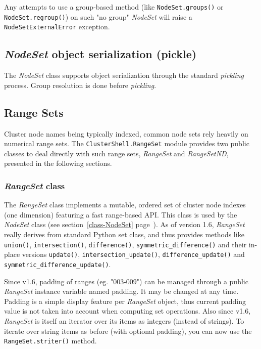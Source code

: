 \documentclass[english,a4paper]{csuserguide}
\newcommand{\NodeSet}{\textit{NodeSet}\xspace}
\newcommand{\RangeSet}{\textit{RangeSet}\xspace}
\newcommand{\RangeSetND}{\textit{RangeSetND}\xspace}
\begin{document}
Any attempts to use a group-based method (like \lstinline+NodeSet.groups()+ or \lstinline+NodeSet.regroup()+) on such "no group" \NodeSet will raise a \texttt{NodeSetExternalError} exception.


\subsection{\NodeSet object serialization (pickle)}

The \NodeSet class supports object serialization through the standard \textit{pickling} process. Group resolution is done before \textit{pickling}.


\subsection{Range Sets}
\label{module-RangeSet}

Cluster node names being typically indexed, common node sets rely heavily on numerical range sets.
The \verb+ClusterShell.RangeSet+ module provides two public classes to deal directly with such range sets, \RangeSet and \RangeSetND, presented in the following sections.

\subsubsection{\RangeSet class}
\label{class-RangeSet}

The \RangeSet class implements a mutable, ordered set of cluster node indexes (one dimension) featuring a fast range-based API. This class is used by the \NodeSet class (see section~\ref{class-NodeSet} page~\pageref{class-NodeSet}). As of version 1.6, \RangeSet really derives from standard Python set class, and thus provides methods like \lstinline+union()+, \lstinline+intersection()+, \lstinline+difference()+, \lstinline+symmetric_difference()+ and their in-place versions \lstinline+update()+, \lstinline+intersection_update()+, \lstinline+difference_update()+ and \lstinline+symmetric_difference_update()+.

Since v1.6, padding of ranges (eg. "003-009") can be managed through a public \RangeSet instance variable named padding. It may be changed at any time. Padding is a simple display feature per \RangeSet object, thus current padding value is not taken into account when computing set operations. Also since v1.6, \RangeSet is itself an iterator over its items as integers (instead of strings). To iterate over string items as before (with optional padding), you can now use the \lstinline+RangeSet.striter()+ method.
\end{document}
